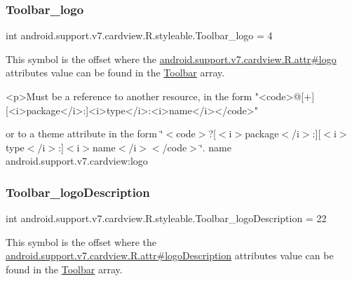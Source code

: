 \subsubsection{\texorpdfstring{Toolbar\+\_\+logo}{Toolbar\_logo}}
{\footnotesize\ttfamily int android.\+support.\+v7.\+cardview.\+R.\+styleable.\+Toolbar\+\_\+logo = 4\hspace{0.3cm}{\ttfamily [static]}}

This symbol is the offset where the \hyperlink{classandroid_1_1support_1_1v7_1_1cardview_1_1R_1_1attr_ad7f81cd76bf157d46c8917cf4d3d886c}{android.\+support.\+v7.\+cardview.\+R.\+attr\#logo} attribute\textquotesingle{}s value can be found in the \hyperlink{classandroid_1_1support_1_1v7_1_1cardview_1_1R_1_1styleable_a26149aeb8fd339abe09ecc9d92b9304f}{Toolbar} array.

\begin{DoxyVerb}      <p>Must be a reference to another resource, in the form "<code>@[+][<i>package</i>:]<i>type</i>:<i>name</i></code>"
\end{DoxyVerb}
 or to a theme attribute in the form \char`\"{}$<$code$>$?\mbox{[}$<$i$>$package$<$/i$>$\+:\mbox{]}\mbox{[}$<$i$>$type$<$/i$>$\+:\mbox{]}$<$i$>$name$<$/i$>$$<$/code$>$\char`\"{}.  name android.\+support.\+v7.\+cardview\+:logo \mbox{\label{classandroid_1_1support_1_1v7_1_1cardview_1_1R_1_1styleable_a8faae4fbd9959da0d13b10544ea5be98}} 
\subsubsection{\texorpdfstring{Toolbar\+\_\+logo\+Description}{Toolbar\_logoDescription}}
{\footnotesize\ttfamily int android.\+support.\+v7.\+cardview.\+R.\+styleable.\+Toolbar\+\_\+logo\+Description = 22\hspace{0.3cm}{\ttfamily [static]}}

This symbol is the offset where the \hyperlink{classandroid_1_1support_1_1v7_1_1cardview_1_1R_1_1attr_ad3e2f083139412eba5cf3a9f92922ef3}{android.\+support.\+v7.\+cardview.\+R.\+attr\#logo\+Description} attribute\textquotesingle{}s value can be found in the \hyperlink{classandroid_1_1support_1_1v7_1_1cardview_1_1R_1_1styleable_a26149aeb8fd339abe09ecc9d92b9304f}{Toolbar} array.

